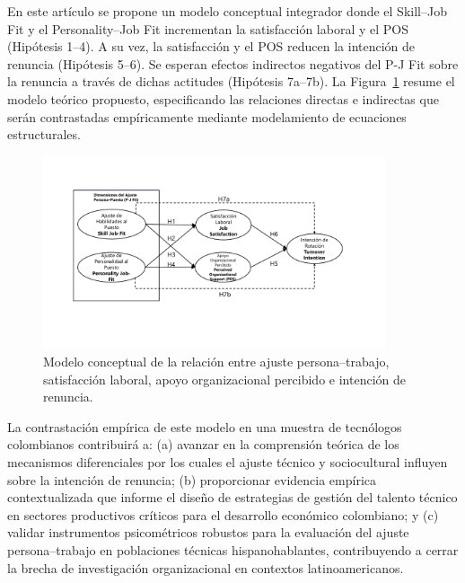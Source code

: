 En este artículo se propone un modelo conceptual integrador donde el Skill--Job Fit y el Personality--Job Fit incrementan la satisfacción laboral y el POS (Hipótesis 1--4). A su vez, la satisfacción y el POS reducen la intención de renuncia (Hipótesis 5--6). Se esperan efectos indirectos negativos del P-J Fit sobre la renuncia a través de dichas actitudes (Hipótesis 7a--7b). La Figura~\ref{fig:conceptual} resume el modelo teórico propuesto, especificando las relaciones directas e indirectas que serán contrastadas empíricamente mediante modelamiento de ecuaciones estructurales.

\begin{figure}[htbp]
  \centering
  \includegraphics[width=0.9\textwidth]{figures/modelo.pdf}
  \caption{Modelo conceptual de la relación entre ajuste persona--trabajo, satisfacción laboral, apoyo organizacional percibido e intención de renuncia.}
  \label{fig:conceptual}
\end{figure}

La contrastación empírica de este modelo en una muestra de tecnólogos colombianos contribuirá a: (a) avanzar en la comprensión teórica de los mecanismos diferenciales por los cuales el ajuste técnico y sociocultural influyen sobre la intención de renuncia; (b) proporcionar evidencia empírica contextualizada que informe el diseño de estrategias de gestión del talento técnico en sectores productivos críticos para el desarrollo económico colombiano; y (c) validar instrumentos psicométricos robustos para la evaluación del ajuste persona--trabajo en poblaciones técnicas hispanohablantes, contribuyendo a cerrar la brecha de investigación organizacional en contextos latinoamericanos.